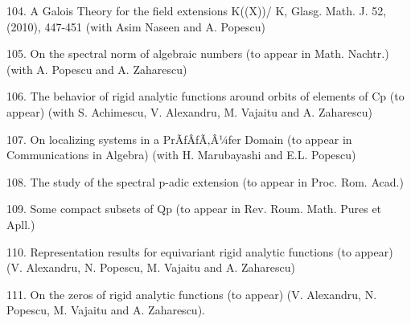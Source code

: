 \documentclass[12pt]{article}
\theoremstyle{plain}
\theoremstyle{definition}
\numberwithin{equation}{section}
\begin{document}
104.    A Galois Theory for the field extensions K((X))/ K, Glasg. Math. J. 52,(2010), 447-451 (with Asim Naseen and A. Popescu)
 
105.    On the spectral norm of algebraic numbers (to appear in Math. Nachtr.) (with A. Popescu and A. Zaharescu)
 
106.    The behavior of rigid analytic functions around orbits of elements of Cp (to appear) (with S. Achimescu, V. Alexandru, M. Vajaitu and A. Zaharescu) 

107.    On localizing systems in a PrÃƒÂƒÃ‚Â¼fer Domain  (to appear in Communications in Algebra) (with H. Marubayashi and E.L. Popescu)
 
108.    The study of the spectral p-adic extension (to appear in Proc. Rom. Acad.) 

109.    Some compact subsets of Qp (to appear in Rev. Roum. Math. Pures et Apll.) 

110.    Representation results for equivariant rigid analytic functions (to appear) (V. Alexandru, N. Popescu, M. Vajaitu and A. Zaharescu) 

111.    On the zeros of rigid analytic functions (to appear) (V. Alexandru, N. Popescu, M. Vajaitu and A. Zaharescu).



\end{document}
